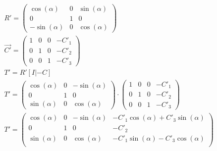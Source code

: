 






\begin{gather}			
	R'= 
	\begin{pmatrix}
		\cos(\alpha)&0&\sin(\alpha)\\
		0&1&0\\
		-\sin(\alpha)&0&\cos(\alpha)
	\end{pmatrix}\\
	\vec{C'}= 
	\begin{pmatrix}
		1&0&0&-C'_1\\
		0&1&0&-C'_2\\
		0&0&1&-C'_3			
	\end{pmatrix}\\
	T'=R'[I|-C]\\
	T'=		\begin{pmatrix}
		\cos(\alpha)&0&-\sin(\alpha)\\
		0&1&0\\
		\sin(\alpha)&0&\cos(\alpha)
	\end{pmatrix} 
	\cdot
	\begin{pmatrix}
		1&0&0&-C'_1\\
		0&1&0&-C'_2\\
		0&0&1&-C'_3			
	\end{pmatrix}\\
	T'=
	\begin{pmatrix}
		\cos(\alpha)&0&-\sin(\alpha)&-C'_1\cos(\alpha)+C'_3\sin(\alpha)\\
		0&1&0&-C'_2\\
		\sin(\alpha)&0&\cos(\alpha)&-C'_1\sin(\alpha)-C'_3\cos(\alpha)\\
	\end{pmatrix}
\end{gather}\\


